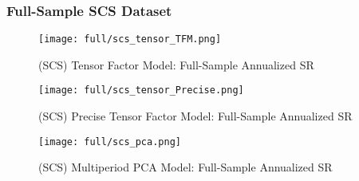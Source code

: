 \subsubsection{Full-Sample SCS Dataset}

\begin{figure}[H]
    \centering
    \texttt{[image: full/scs\_tensor\_TFM.png]}
    \caption{(SCS) Tensor Factor Model: Full-Sample Annualized SR}
    \label{fig:scs-primary-tfm}
\end{figure}

\begin{figure}[H]
    \centering
    \texttt{[image: full/scs\_tensor\_Precise.png]}
    \caption{(SCS) Precise Tensor Factor Model: Full-Sample Annualized SR}
    \label{fig:scs-primary-precise}
\end{figure}


\begin{figure}[H]
    \centering
    \texttt{[image: full/scs\_pca.png]}
    \caption{(SCS) Multiperiod PCA Model: Full-Sample Annualized SR}
    \label{fig:scs-primary-pca}
\end{figure}
